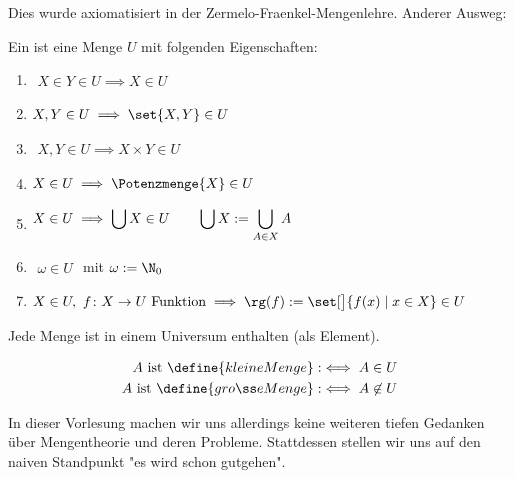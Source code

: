 Dies wurde axiomatisiert in der Zermelo-Fraenkel-Mengenlehre.\nl
Anderer Ausweg: 
\begin{definition}
	Ein  ist eine Menge $U$ mit folgenden Eigenschaften:
	\begin{enumerate}[label=(\roman*)]
		\item $\begin{aligned}
			X\in Y\in U\implies X\in U
		\end{aligned}$
		\item $\begin{aligned}
			X,Y\in U\implies\set{X,Y}\in U
		\end{aligned}$
		\item $\begin{aligned}
			X,Y\in U\implies X\times Y\in U
		\end{aligned}$
		\item $\begin{aligned}
			X\in U\implies\Potenzmenge{X}\in U
		\end{aligned}$
		\item $\begin{aligned}
			X\in U\implies \bigcup X\in U\qquad\mit \bigcup X:=\bigcup\limits_{A\in X}A
		\end{aligned}$
		\item $\begin{aligned}
			\omega\in U
		\end{aligned}$ mit $\omega:=\N_0$
		\item $\begin{aligned}
			X\in U,~f\colon X\to U\text{ Funktion}\implies\rg(f):=\set[\big]{f(x)\mid x\in X}\in U
		\end{aligned}$
	\end{enumerate}
\end{definition}

\begin{axiom}
	Jede Menge ist in einem Universum enthalten (als Element).
\end{axiom}

\begin{definition}
	\begin{align*}\index{kleine Menge}\index{große Menge}
		A\text{ ist }\define{kleine Menge} &:\iff A\in U\\
		A\text{ ist }\define{große Menge} &:\iff A\not\in U\\
	\end{align*}
\end{definition}

In dieser Vorlesung machen wir uns allerdings keine weiteren tiefen Gedanken über Mengentheorie und deren Probleme.
Stattdessen stellen wir uns auf den naiven Standpunkt
"es wird schon gutgehen".

